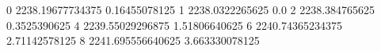 0 2238.19677734375 0.16455078125
1 2238.0322265625 0.0
2 2238.384765625 0.3525390625
4 2239.55029296875 1.51806640625
6 2240.74365234375 2.71142578125
8 2241.695556640625 3.663330078125
